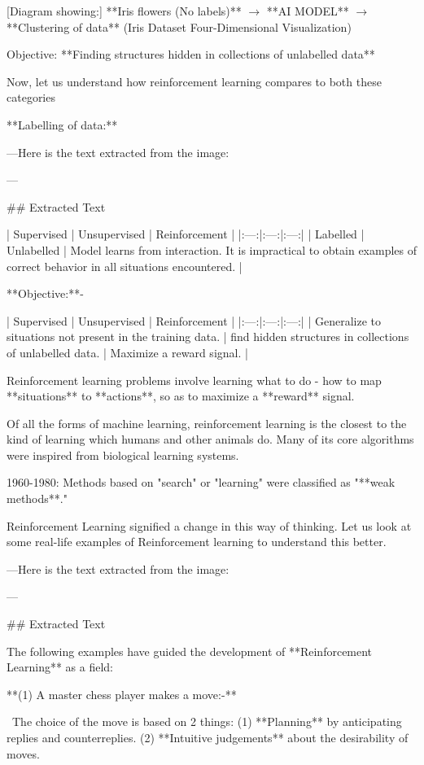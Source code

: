 [Diagram showing:] **Iris flowers (No labels)** $\to$ **AI MODEL** $\to$ **Clustering of data** (Iris Dataset Four-Dimensional Visualization)

Objective: **Finding structures hidden in collections of unlabelled data**

Now, let us understand how reinforcement learning compares to both these categories

**Labelling of data:**

---Here is the text extracted from the image:

---

## Extracted Text

| Supervised | Unsupervised | Reinforcement |
|:---:|:---:|:---:|
| Labelled | Unlabelled | Model learns from interaction. It is impractical to obtain examples of correct behavior in all situations encountered. |

**Objective:**-

| Supervised | Unsupervised | Reinforcement |
|:---:|:---:|:---:|
| Generalize to situations not present in the training data. | find hidden structures in collections of unlabelled data. | Maximize a reward signal. |

Reinforcement learning problems involve learning what to do - how to map **situations** to **actions**, so as to maximize a **reward** signal.

Of all the forms of machine learning, reinforcement learning is the closest to the kind of learning which humans and other animals do. Many of its core algorithms were inspired from biological learning systems.

1960-1980: Methods based on "search" or "learning" were classified as "**weak methods**."

Reinforcement Learning signified a change in this way of thinking. Let us look at some real-life examples of Reinforcement learning to understand this better.

---Here is the text extracted from the image:

---

## Extracted Text

The following examples have guided the development of **Reinforcement Learning** as a field:

**(1) A master chess player makes a move:-**

 The choice of the move is based on 2 things:
(1) **Planning** by anticipating replies and counterreplies.
(2) **Intuitive judgements** about the desirability of moves.

